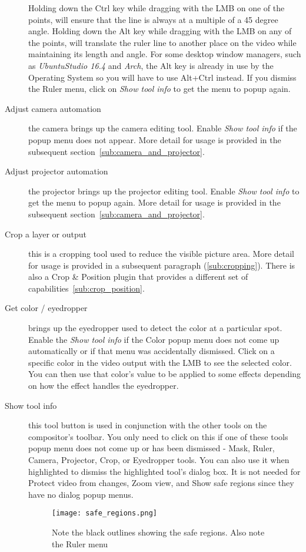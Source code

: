 \begin{description}
Holding down the Ctrl key while dragging with the LMB on one of the points, will
ensure that the line is always at a multiple of a 45 degree angle.  Holding down the Alt key while
dragging with the LMB on any of the points, will translate the ruler line to another place on 
the video while maintaining its length and angle. For some desktop window managers, such as 
\textit{UbuntuStudio 16.4} and \textit{Arch}, the Alt key is already in use by the Operating System
so you will have to use Alt+Ctrl instead.
If you dismiss the Ruler menu, click on
\textit{Show tool info} to get the menu to popup again.  
    \item[Adjust camera automation]  the camera brings up the camera editing tool. Enable \textit{Show tool info} if the popup menu does not appear. More detail for usage is provided in the subsequent
section~\ref{sub:camera_and_projector}.
    \item[Adjust projector automation]  the projector brings up the projector editing tool. Enable \textit{Show tool info} to get the menu to popup again. More detail for usage is provided in the
subsequent section~\ref{sub:camera_and_projector}.
    \item[Crop a layer or output]  this is a cropping tool used to reduce the visible picture area.
More detail for usage is provided in a 
subsequent paragraph (\ref{sub:cropping}).  There is also a Crop \& Position plugin that provides
a different set of capabilities~\ref{sub:crop_position}.
    \item[Get color / eyedropper]  brings up the eyedropper used to detect the color at a
particular spot.  Enable the \textit{Show tool info} if the Color popup menu does not come up 
automatically or if that menu was accidentally dismissed.  Click on a specific color in the video
output with the LMB to see the selected color. You can then use that color's 
value to be applied to some effects depending on how the effect handles the eyedropper.
    \item[Show tool info]  this tool button is used in conjunction with the other tools on the
compositor's toolbar. You only need to click on this if one of these tools popup menu does not
come up or has been dismissed - Mask, Ruler, Camera, Projector, Crop, or Eyedropper tools.
You can also use it when highlighted to dismiss the highlighted tool's dialog box.
It is not needed for Protect video from changes, Zoom view, and Show safe regions since they have
no dialog popup menus.

\begin{figure}[htpb]
    \centering
    \texttt{[image: safe\_regions.png]}
    \caption{Note the black outlines showing the safe regions. Also note the Ruler menu}
    \label{fig:safe_regions}
\end{figure}


\end{description}
